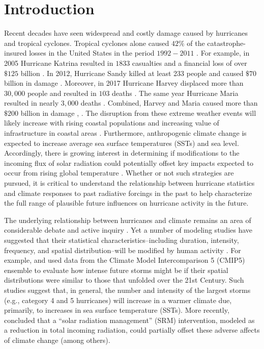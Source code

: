 \section{Introduction}
\label{intro}
\par
Recent decades have seen widespread and costly damage caused by
hurricanes and tropical cyclones. Tropical cyclones alone caused
$42\%$ of the catastrophe-insured losses in the United States in the
period $1992-2011$ \cite{tc_reanal:1}. For example, in 2005 Hurricane
Katrina resulted in $1833$ casualties and a financial loss of over
$\$125$ billion \cite{tc_reanal:1}. In 2012, Hurricane Sandy killed at
least 233 people and caused $\$70$ billion in damage
\cite{sandy_rpt}. Moreover, in 2017 Hurricane Harvey displaced more
than $30,000$ people and resulted in $103$ deaths
\cite{harvey_rpt}. The same year Hurricane Maria resulted in nearly
$3,000$ deaths \cite{maria_rpt}. Combined, Harvey and Maria caused
more than $\$200$ billion in damage \cite{harvey_rpt},
\cite{maria_rpt}. The disruption from these extreme weather events
will likely increase with rising coastal populations and increasing
value of infrastructure in coastal areas
\cite{kerry_tc_clim}. Furthermore, anthropogenic climate change is
expected to increase average sea surface temperatures (SSTs)
\cite{ipcc_2007} and sea level. Accordingly, there is growing interest
in determining if modifications to the incoming flux of solar
radiation could potentially offset key impacts expected to occur from
rising global temperature \cite{irving2019hurricanes}. Whether or not
such strategies are pursued, it is critical to understand the
relationship between hurricane statistics and climate responses to
past radiative forcings in the past to help characterize the full
range of plausible future influences on hurricane activity in the
future.
\par

The underlying relationship between hurricanes and climate remains an
area of considerable debate and active inquiry \cite{REF,REF,REF}. Yet
a number of modeling studies have suggested that their statistical
characteristics--including duration, intensity, frequency, and spatial
distribution--will be modified by human activity
\cite{REF,REF,REF}. For example, \cite{REF} and \cite{REF} used data
from the Climate Model Intercomparison 5 (CMIP5) ensemble to evaluate
how intense future storms might be if their spatial distributions were
similar to those that unfolded over the 21st Century. Such studies
suggest that, in general, the number and intensity of the largest
storms (e.g., category 4 and 5 hurricanes) will increase in a warmer
climate due, primarily, to increases in sea surface temperature
(SSTs). More recently, \cite{irving2019hurricanes} concluded that a
``solar radiation management'' (SRM) intervention, modeled as a reduction in
total incoming radiation, could partially offset these adverse affects
of climate change (among others).

